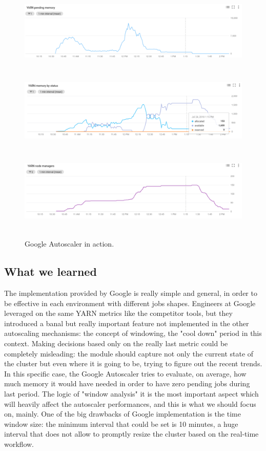 \documentclass[12pt,twoside,cucitura]{toptesi}
\begin{document}
\begin{figure}
\centering
\includegraphics[height=40mm]{dataproc-example1}
\includegraphics[height=40mm]{dataproc-example2}
\includegraphics[height=40mm]{dataproc-example3}
\caption{Google Autoscaler in action.}\label{fig:dataproc-example}
\end{figure}

\subsection{What we learned}
The implementation provided by Google is really simple and general, in order to be effective in each environment with different jobs shapes. Engineers at Google leveraged on the same YARN metrics like the competitor tools, but they introduced a banal but really important feature not implemented in the other autoscaling mechanisms: the concept of windowing, the "cool down" period in this context. 
Making decisions based only on the really last metric could be completely misleading: the module should capture not only the current state of the cluster but even where it is going to be, trying to figure out the recent trends. In this specific case, the Google Autoscaler tries to evaluate, on average, how much memory it would have needed in order to have zero pending jobs during last period. The logic of "window analysis" it is the most important aspect which will heavily affect the autoscaler performances, and this is what we should focus on, mainly. One of the big drawbacks of Google implementation is the time window size: the minimum interval that could be set is 10 minutes, a huge interval that does not allow to promptly resize the cluster based on the real-time workflow.
\end{document}
